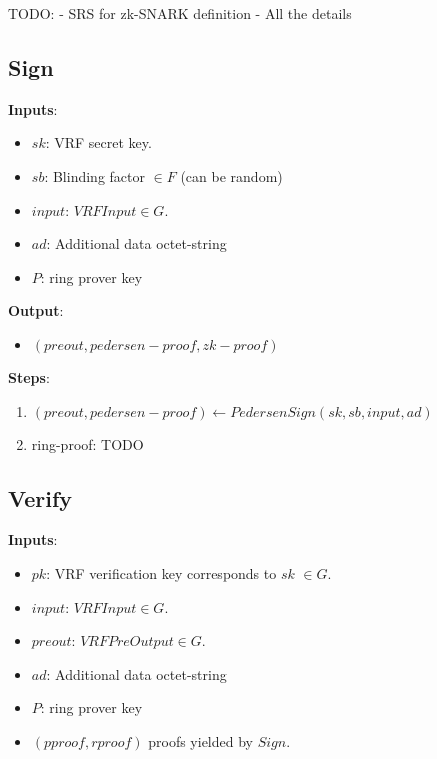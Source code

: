 \documentclass[
]{article}
\providecommand{\tightlist}{%
  \setlength{\itemsep}{0pt}\setlength{\parskip}{0pt}}
\begin{document}
TODO: - SRS for zk-SNARK definition - All the details

\hypertarget{sign-2}{%
\subsection{Sign}\label{sign-2}}

\textbf{Inputs}:

\begin{itemize}
\tightlist
\item
  \(sk\): VRF secret key.
\item
  \(sb\): Blinding factor \(\in F\) (can be random)
\item
  \(input\): \(VRFInput \in G\).
\item
  \(ad\): Additional data octet-string
\item
  \(P\): ring prover key
\end{itemize}

\textbf{Output}:

\begin{itemize}
\tightlist
\item
  \((preout, pedersen-proof, zk-proof)\)
\end{itemize}

\textbf{Steps}:

\begin{enumerate}
\def\labelenumi{\arabic{enumi}.}
\tightlist
\item
  \((preout, pedersen-proof) \leftarrow PedersenSign(sk, sb, input, ad)\)
\item
  ring-proof: TODO
\end{enumerate}

\hypertarget{verify-2}{%
\subsection{Verify}\label{verify-2}}

\textbf{Inputs}:

\begin{itemize}
\tightlist
\item
  \(pk\): VRF verification key corresponds to \(sk\) \(\in G\).
\item
  \(input\): \(VRFInput \in G\).
\item
  \(preout\): \(VRFPreOutput \in G\).
\item
  \(ad\): Additional data octet-string
\item
  \(P\): ring prover key
\item
  \((pproof, rproof)\) proofs yielded by \(Sign\).
\end{itemize}
\end{document}
